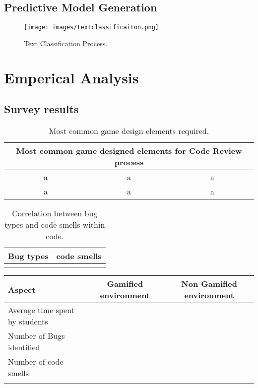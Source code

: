 \documentclass[conference]{IEEEtran}
\begin{document}
\subsection{Predictive Model Generation}

\begin{figure}[ht]
\hspace{-6ex}
\centering
\texttt{[image: images/textclassificaiton.png]}
\caption{Text Classification Process.}
\label{fig:activity}
\end{figure}


\section{Emperical Analysis}

\subsection{Survey results}

\begin{table}[h]
\centering
\caption{Most common game design elements required.}
\begin{tabular}{|ccc|} \hline
 \multicolumn{3}{|c|}{Most common game designed elements for Code Review process}  \\ \hline
 a & a & a \\
 a & a & a \\
 \hline
\end{tabular}
\label{tab:gamede}
\end{table}

\begin{table}[h]
\centering
\caption{Correlation between bug types and code smells within code.}
\begin{tabular}{|c|c|} \hline
 Bug types & code smells \\ \hline
 & \\
 \hline
\end{tabular}
\label{tab:bugsandsmells}
\end{table}

\begin{tabular}{|p{3cm}|c|c|} \hline
Aspect & Gamified environment & Non Gamified environment \\ \hline
Average time spent by students & & \\
Number of Bugs identified  & & \\
Number of code smells &  \\
 & 
\end{tabular}
\end{document}
